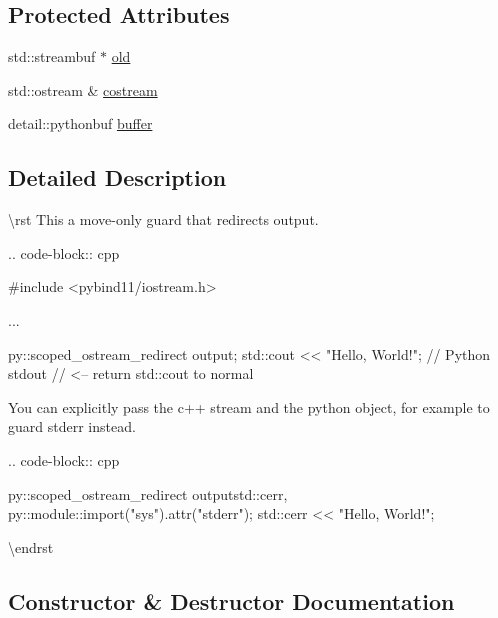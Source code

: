\subsection*{Protected Attributes}
\begin{DoxyCompactItemize}
\item 
std\+::streambuf $\ast$ \mbox{\hyperlink{classscoped__ostream__redirect_a519992f77b1bfc432f151b2a890a85cf}{old}}
\item 
std\+::ostream \& \mbox{\hyperlink{classscoped__ostream__redirect_a1d9b813b2e4e5bd72b1a735a9e9b13cb}{costream}}
\item 
detail\+::pythonbuf \mbox{\hyperlink{classscoped__ostream__redirect_a8c3f64929efe3287aaa247f5c8d0559d}{buffer}}
\end{DoxyCompactItemize}


\subsection{Detailed Description}
\textbackslash{}rst This a move-\/only guard that redirects output.

.. code-\/block\+:: cpp \begin{DoxyVerb}#include <pybind11/iostream.h>

...

{
    py::scoped_ostream_redirect output;
    std::cout << "Hello, World!"; // Python stdout
} // <-- return std::cout to normal
\end{DoxyVerb}


You can explicitly pass the c++ stream and the python object, for example to guard stderr instead.

.. code-\/block\+:: cpp \begin{DoxyVerb}{
    py::scoped_ostream_redirect output{std::cerr, py::module::import("sys").attr("stderr")};
    std::cerr << "Hello, World!";
}
\end{DoxyVerb}
 \textbackslash{}endrst 

\subsection{Constructor \& Destructor Documentation}
\mbox{\label{classscoped__ostream__redirect_ad03c41b00f3efb1753c75e9e5962e1cd}} 
